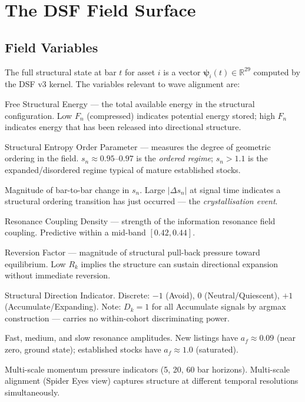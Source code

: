 \documentclass[11pt, a4paper]{article}
\newcommand{\Fn}{F_n}
\newcommand{\sn}{s_n}
\newcommand{\rhon}{\rho_n}
\newcommand{\Rk}{R_k}
\newcommand{\Dk}{D_k}
\newcommand{\dsn}{|\Delta s_n|}
\theoremstyle{definition}
\begin{document}
\section{The DSF Field Surface}

\subsection{Field Variables}

The full structural state at bar $t$ for asset $i$ is a vector
$\boldsymbol{\psi}_i(t) \in \mathbb{R}^{29}$ computed by the DSF v3 kernel.
The variables relevant to wave alignment are:

\begin{description}[leftmargin=4em, labelwidth=3.5em]
  \item[$\Fn$]   Free Structural Energy — the total available energy in the
                  structural configuration.
                  Low $\Fn$ (compressed) indicates potential energy stored;
                  high $\Fn$ indicates energy that has been released into
                  directional structure.
  \item[$\sn$]   Structural Entropy Order Parameter — measures the degree of
                  geometric ordering in the field.
                  $\sn \approx 0.95$--$0.97$ is the \emph{ordered regime};
                  $\sn > 1.1$ is the expanded/disordered regime typical of
                  mature established stocks.
  \item[$\dsn$]  Magnitude of bar-to-bar change in $\sn$.
                  Large $\dsn$ at signal time indicates a structural ordering
                  transition has just occurred — the \emph{crystallisation event}.
  \item[$\rhon$] Resonance Coupling Density — strength of the information
                  resonance field coupling.
                  Predictive within a mid-band $[0.42, 0.44]$.
  \item[$\Rk$]   Reversion Factor — magnitude of structural pull-back pressure
                  toward equilibrium.
                  Low $\Rk$ implies the structure can sustain directional
                  expansion without immediate reversion.
  \item[$\Dk$]   Structural Direction Indicator.
                  Discrete: $-1$ (Avoid), $0$ (Neutral/Quiescent), $+1$
                  (Accumulate/Expanding).
                  Note: $\Dk = 1$ for all Accumulate signals by argmax
                  construction — carries no within-cohort discriminating power.
  \item[$a_f, a_m, a_s$] Fast, medium, and slow resonance amplitudes.
                  New listings have $a_f \approx 0.09$ (near zero, ground state);
                  established stocks have $a_f \approx 1.0$ (saturated).
  \item[$Q_5, Q_{20}, Q_{60}$] Multi-scale momentum pressure indicators (5, 20,
                  60 bar horizons).
                  Multi-scale alignment (Spider Eyes view) captures structure at
                  different temporal resolutions simultaneously.
\end{description}
\end{document}
